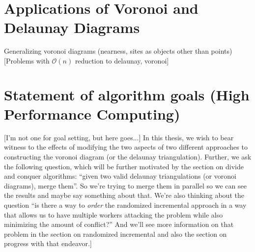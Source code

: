 \documentclass[12pt,twoside]{reedthesis}
\begin{document}
  \section{Applications of Voronoi and Delaunay Diagrams} %
  \label{sec:applications_of_voronoi_and_delaunay_diagrams}
  Generalizing voronoi diagrams (nearness, sites as objects other than points)
  [Problems with $\mathcal{O}(n)$ reduction to delaunay, voronoi]
  
  \section{Statement of algorithm goals (High Performance Computing)} %
  \label{sec:statement_of_algorithm_goals_high_performance_computing_}
    [I'm not one for goal setting, but here goes...] In this thesis, we wish to bear witness to the effects of modifying the two aspects of two different approaches to constructing the voronoi diagram (or the delaunay triangulation). Further, we ask the following question, which will be further motivated by the section on divide and conquer algorithms: ``given two valid delaunay triangulations (or voronoi diagrams), merge them''. So we're trying to merge them in parallel so we can see the results and maybe say something about that. We're also thinking about the question ``is there a way to \emph{order} the randomized incremental approach in a way that allows us to have multiple workers attacking the problem while also minimizing the amount of conflict?'' And we'll see more information on that problem in the section on randomized incremental and also the section on progress with that endeavor.]
\end{document}
